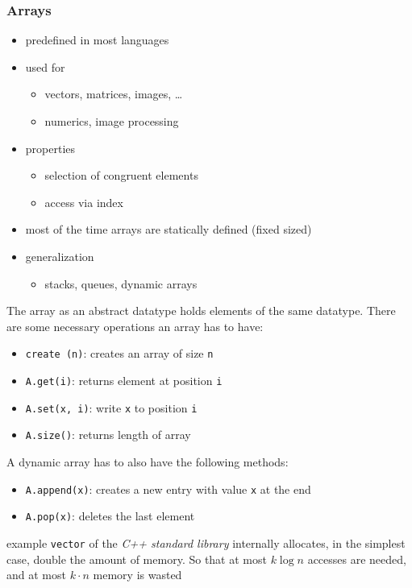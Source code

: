 \documentclass[a4paper]{article}
\begin{document}
\subsubsection{Arrays}
\begin{itemize}
    \item predefined in most languages
    \item used for
        \begin{itemize}
            \item vectors, matrices, images, \dots
            \item numerics, image processing
        \end{itemize}
    \item properties
        \begin{itemize}
            \item selection of congruent elements
            \item access via index
        \end{itemize}
    \item most of the time arrays are statically defined (fixed sized)
    \item generalization
        \begin{itemize}
            \item stacks, queues, dynamic arrays
        \end{itemize}
\end{itemize}
The array as an abstract datatype holds elements of the same datatype.
There are some necessary operations an array has to have:
\begin{itemize}
    \item \texttt{create (n)}: creates an array of size \texttt{n}
    \item \verb&A.get(i)&: returns element at position \texttt{i}
    \item \verb&A.set(x, i)&: write \texttt{x} to position \texttt{i}
    \item \verb&A.size()&: returns length of array
\end{itemize}
A dynamic array has to also have the following methods:
\begin{itemize}
    \item \verb&A.append(x)&: creates a new entry with value \texttt{x} at the end
    \item \verb&A.pop(x)&: deletes the last element
\end{itemize}
example \texttt{vector} of the \emph{C++ standard library} internally allocates, in the simplest case, double the amount of memory.
So that at most $ k \log{n} $ accesses are needed, and at most $ k \cdot n $ memory is wasted
\end{document}
